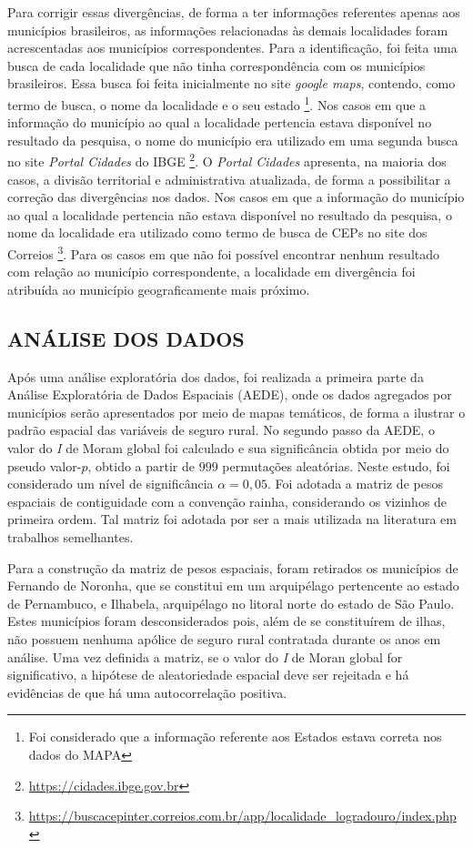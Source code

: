 Para corrigir essas divergências, de forma a ter informações referentes apenas aos municípios brasileiros, as informações relacionadas às demais localidades foram acrescentadas aos municípios correspondentes. Para a identificação, foi feita uma busca de cada localidade que não tinha correspondência com os municípios brasileiros. Essa busca foi feita inicialmente no site \textit{google maps}, contendo, como termo de busca, o nome da localidade e o seu estado \footnote{Foi considerado que a informação referente aos Estados estava correta nos dados do MAPA}. Nos casos em que a informação do município ao qual a localidade pertencia estava disponível no resultado da pesquisa, o nome do município era utilizado em uma segunda busca no site \textit{Portal Cidades} do IBGE \footnote{\url{https://cidades.ibge.gov.br}}. O \textit{Portal Cidades} apresenta, na maioria dos casos, a divisão territorial e administrativa atualizada, de forma a possibilitar a correção das divergências nos dados. Nos casos em que a informação do município ao qual a localidade pertencia não estava disponível no resultado da pesquisa, o nome da localidade era utilizado como termo de busca de CEPs no site dos Correios \footnote{\url{https://buscacepinter.correios.com.br/app/localidade_logradouro/index.php}}. Para os casos em que não foi possível encontrar nenhum resultado com relação ao município correspondente, a localidade em divergência foi atribuída ao município geograficamente mais próximo. 

\subsection{ANÁLISE DOS DADOS} 

Após uma análise exploratória dos dados, foi realizada a primeira parte da Análise Exploratória de Dados Espaciais (AEDE), onde os dados agregados por municípios serão apresentados por meio de mapas temáticos, de forma a ilustrar o padrão espacial das variáveis de seguro rural. No segundo passo da AEDE, o valor do \textit{I} de Moram global foi calculado e sua significância obtida por meio do pseudo valor-$p$, obtido a partir de $999$ permutações aleatórias. Neste estudo, foi considerado um nível de significância $\alpha = 0,05$. Foi adotada a matriz de pesos espaciais de contiguidade com a convenção rainha, considerando os vizinhos de primeira ordem. Tal matriz foi adotada por ser a mais utilizada na literatura em trabalhos semelhantes. 

Para a construção da matriz de pesos espaciais, foram retirados os municípios de Fernando de Noronha, que se constitui em um arquipélago pertencente ao estado de Pernambuco, e Ilhabela, arquipélago no litoral norte do estado de São Paulo. Estes municípios foram desconsiderados pois, além de se constituírem de ilhas, não possuem nenhuma apólice de seguro rural contratada durante os anos em análise. Uma vez definida a matriz, se o valor do \textit{I} de Moran global for significativo, a hipótese de aleatoriedade espacial deve ser rejeitada e há evidências de que há uma autocorrelação positiva. 

